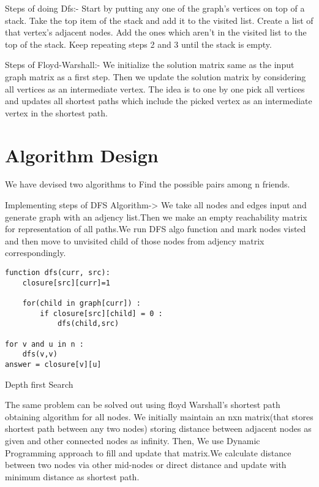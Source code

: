 \documentclass[conference]{IEEEtran}
\begin{document}
Steps of doing Dfs:-
Start by putting any one of the graph's vertices on top of a stack.
Take the top item of the stack and add it to the visited list.
Create a list of that vertex's adjacent nodes. Add the ones which aren't in the visited list to the top of the stack.
Keep repeating steps 2 and 3 until the stack is empty.

Steps of Floyd-Warshall:-
We initialize the solution matrix same as the input graph matrix as a first step. Then we update the solution matrix by considering all vertices as an intermediate vertex. The idea is to one by one pick all vertices and updates all shortest paths which include the picked vertex as an intermediate vertex in the shortest path.

\section{Algorithm Design}
We have devised two algorithms to Find the possible pairs among n friends.

Implementing steps of DFS Algorithm->
We take all nodes and edges input and generate graph with an adjency list.Then we make an empty reachability matrix for representation of all paths.We run DFS algo function and mark nodes visted and then move to unvisited child of those nodes from adjency matrix correspondingly.
\bigskip
\begin{algorithm}[H]
\begin{lstlisting}
function dfs(curr, src):
    closure[src][curr]=1

    for(child in graph[curr]) :
        if closure[src][child] = 0 :
            dfs(child,src)

for v and u in n :
    dfs(v,v)
answer = closure[v][u]
\end{lstlisting}
 \caption{Depth first Search }
\end{algorithm}

The same problem can be solved out using floyd Warshall's shortest path obtaining algorithm for all nodes.
\newline We initially maintain an nxn matrix(that stores shortest path between any two nodes)  storing distance between adjacent nodes as given and other connected nodes as infinity.
\newline Then, We use Dynamic Programming approach to fill and update that matrix.We calculate distance between two nodes via other mid-nodes or direct distance and update with minimum distance as shortest path.
\bigskip
\end{document}
